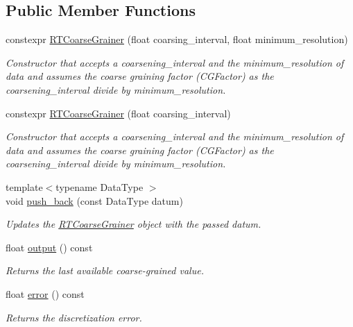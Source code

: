 \subsection*{Public Member Functions}
\begin{DoxyCompactItemize}
\item 
constexpr \hyperlink{classRTCoarseGrainer_a67187c9ba3d8142c23379392dec4e35d}{R\+T\+Coarse\+Grainer} (float coarsing\+\_\+interval, float minimum\+\_\+resolution)
\begin{DoxyCompactList}\small\item\em Constructor that accepts a {\ttfamily coarsening\+\_\+interval} and the {\ttfamily minimum\+\_\+resolution} of data and assumes the coarse graining factor ({\ttfamily C\+G\+Factor}) as the {\ttfamily coarsening\+\_\+interval} divide by {\ttfamily minimum\+\_\+resolution}. \end{DoxyCompactList}\item 
constexpr \hyperlink{classRTCoarseGrainer_af46c3757bdda8ce79f8655d5556d845b}{R\+T\+Coarse\+Grainer} (float coarsing\+\_\+interval)
\begin{DoxyCompactList}\small\item\em Constructor that accepts a {\ttfamily coarsening\+\_\+interval} and the {\ttfamily minimum\+\_\+resolution} of data and assumes the coarse graining factor ({\ttfamily C\+G\+Factor}) as the {\ttfamily coarsening\+\_\+interval} divide by {\ttfamily minimum\+\_\+resolution}. \end{DoxyCompactList}\item 
{\footnotesize template$<$typename Data\+Type $>$ }\\void \hyperlink{classRTCoarseGrainer_a92ba58efd22b7c3c9e79cd4d5e065e70}{push\+\_\+back} (const Data\+Type datum)
\begin{DoxyCompactList}\small\item\em Updates the {\ttfamily \hyperlink{classRTCoarseGrainer}{R\+T\+Coarse\+Grainer}} object with the passed datum. \end{DoxyCompactList}\item 
float \hyperlink{classRTCoarseGrainer_a2d0cd547401422150d1293a156abc86e}{output} () const
\begin{DoxyCompactList}\small\item\em Returns the last available coarse-\/grained value. \end{DoxyCompactList}\item 
float \hyperlink{classRTCoarseGrainer_a0a2a0cf51154b2ed00d18e397e0e0c95}{error} () const
\begin{DoxyCompactList}\small\item\em Returns the discretization error. \end{DoxyCompactList}\end{DoxyCompactItemize}
